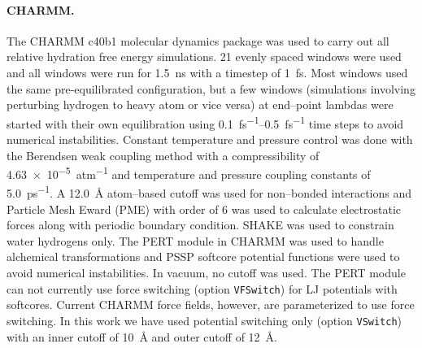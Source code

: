 \documentclass[journal=jctcce,manuscript=article]{achemso}
\newcommand{\inpopt}[1]{\texttt{#1}}
\begin{document}
\paragraph{CHARMM.} The CHARMM c40b1 molecular dynamics package was used to
carry out all relative hydration free energy simulations.  21 evenly spaced
windows were used and all windows were run for \SI{1.5}{ns} with a timestep of \SI{1}{fs}.  Most windows used the same pre-equilibrated configuration, but a few windows (simulations involving perturbing hydrogen to heavy atom or vice versa) at end--point lambdas were started with their own equilibration using
\SI{0.1}{fs^{-1}}--\SI{0.5}{fs^{-1}} time steps to avoid numerical instabilities.
 Constant temperature and pressure control was done with the Berendsen weak coupling method with a
compressibility of \SI{4.63e-5}{atm^{-1}} and temperature and pressure coupling
constants of \SI{5.0}{ps^{-1}}.  A \SI{12.0}{\angstrom} atom--based cutoff was used for non--bonded interactions and Particle Mesh Eward (PME) with order of 6 was used to calculate electrostatic forces along with periodic boundary condition.  SHAKE was used to constrain water hydrogens only.  The PERT module
in CHARMM was used to handle alchemical transformations and PSSP
softcore potential functions were used to avoid numerical instabilities.  In
vacuum, no cutoff was used.
The PERT module can not currently use force switching (option \inpopt{VFSwitch}) for LJ potentials with softcores.  Current CHARMM force fields, however, are parameterized to use force switching. %
In this work we have used potential switching only (option \inpopt{VSwitch}) with an inner cutoff of \SI{10}{\angstrom} and outer cutoff of \SI{12}{\angstrom}.
\end{document}
